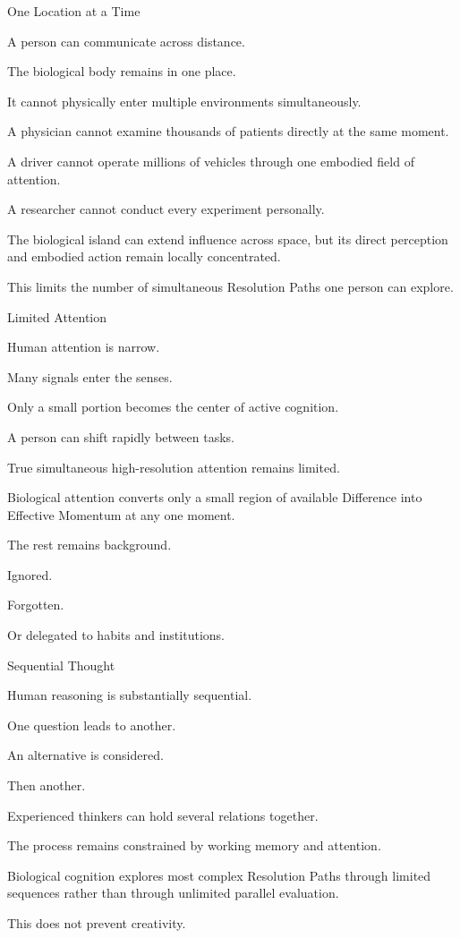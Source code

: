 One Location at a Time

A person can communicate across distance.

The biological body remains in one place.

It cannot physically enter multiple environments simultaneously.

A physician cannot examine thousands of patients directly at the same moment.

A driver cannot operate millions of vehicles through one embodied field of attention.

A researcher cannot conduct every experiment personally.

The biological island can extend influence across space, but its direct perception and embodied action remain locally concentrated.

This limits the number of simultaneous Resolution Paths one person can explore.

Limited Attention

Human attention is narrow.

Many signals enter the senses.

Only a small portion becomes the center of active cognition.

A person can shift rapidly between tasks.

True simultaneous high-resolution attention remains limited.

Biological attention converts only a small region of available Difference into Effective Momentum at any one moment.

The rest remains background.

Ignored.

Forgotten.

Or delegated to habits and institutions.

Sequential Thought

Human reasoning is substantially sequential.

One question leads to another.

An alternative is considered.

Then another.

Experienced thinkers can hold several relations together.

The process remains constrained by working memory and attention.

Biological cognition explores most complex Resolution Paths through limited sequences rather than through unlimited parallel evaluation.

This does not prevent creativity.

